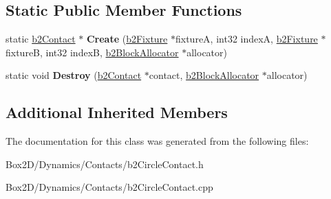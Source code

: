 \subsection*{Static Public Member Functions}
\begin{DoxyCompactItemize}
\item 
\mbox{\label{classb2_circle_contact_ab0ea452487cb19217ae8480dbc22fd41}} 
static \hyperlink{classb2_contact}{b2\+Contact} $\ast$ {\bfseries Create} (\hyperlink{classb2_fixture}{b2\+Fixture} $\ast$fixtureA, int32 indexA, \hyperlink{classb2_fixture}{b2\+Fixture} $\ast$fixtureB, int32 indexB, \hyperlink{classb2_block_allocator}{b2\+Block\+Allocator} $\ast$allocator)
\item 
\mbox{\label{classb2_circle_contact_a4ca67c653a18d88180e49149f0df742a}} 
static void {\bfseries Destroy} (\hyperlink{classb2_contact}{b2\+Contact} $\ast$contact, \hyperlink{classb2_block_allocator}{b2\+Block\+Allocator} $\ast$allocator)
\end{DoxyCompactItemize}
\subsection*{Additional Inherited Members}


The documentation for this class was generated from the following files\+:\begin{DoxyCompactItemize}
\item 
Box2\+D/\+Dynamics/\+Contacts/b2\+Circle\+Contact.\+h\item 
Box2\+D/\+Dynamics/\+Contacts/b2\+Circle\+Contact.\+cpp\end{DoxyCompactItemize}
